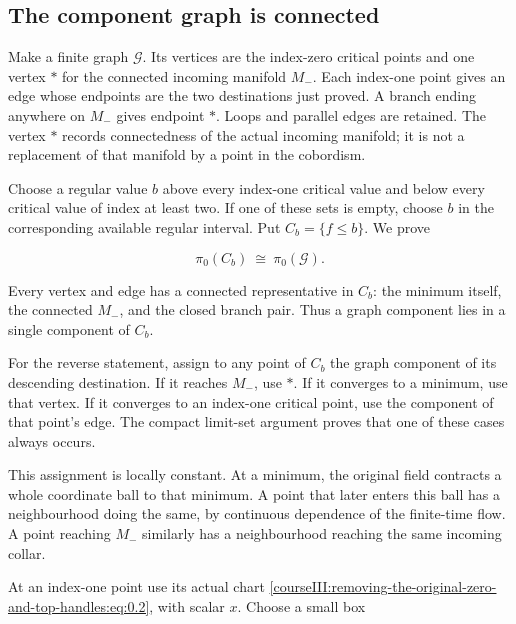 \subsection{The component graph is connected}
\label{courseIII:removing-the-original-zero-and-top-handles:zero-component-graph}

\label{courseIII:removing-the-original-zero-and-top-handles:section-2}\label{courseIII:zero-top:2}

Make a finite graph \(\mathcal G\). Its vertices are the index-zero critical points and one vertex \(*\) for the connected incoming manifold \(M_-\). Each index-one point gives an edge whose endpoints are the two destinations just proved. A branch ending anywhere on \(M_-\) gives endpoint \(*\). Loops and parallel edges are retained. The vertex \(*\) records connectedness of the actual incoming manifold; it is not a replacement of that manifold by a point in the cobordism.

Choose a regular value \(b\) above every index-one critical value and below every critical value of index at least two. If one of these sets is empty, choose \(b\) in the corresponding available regular interval. Put \(C_b=\{f\leq b\}\). We prove

\begin{equation}
\pi_0(C_b)\ \cong\ \pi_0(\mathcal G).
 \label{courseIII:removing-the-original-zero-and-top-handles:eq:2.1}
\end{equation}

Every vertex and edge has a connected representative in \(C_b\): the minimum itself, the connected \(M_-\), and the closed branch pair. Thus a graph component lies in a single component of \(C_b\).

For the reverse statement, assign to any point of \(C_b\) the graph component of its descending destination. If it reaches \(M_-\), use \(*\). If it converges to a minimum, use that vertex. If it converges to an index-one critical point, use the component of that point's edge. The compact limit-set argument proves that one of these cases always occurs.

This assignment is locally constant. At a minimum, the original field contracts a whole coordinate ball to that minimum. A point that later enters this ball has a neighbourhood doing the same, by continuous dependence of the finite-time flow. A point reaching \(M_-\) similarly has a neighbourhood reaching the same incoming collar.

At an index-one point use its actual chart \eqref{courseIII:removing-the-original-zero-and-top-handles:eq:0.2}, with scalar \(x\). Choose a small box

